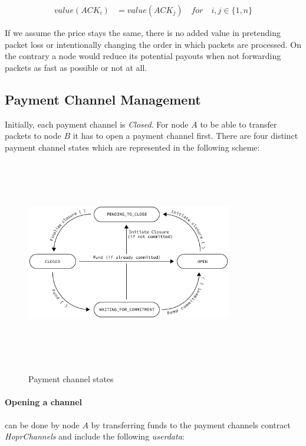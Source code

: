 \begin{align}
value ( ACK_i )  &  =value ( ACK_j ) \quad for \quad i,j\in \{1,n\}
\end{align}

If we assume the price stays the same, there is no added value in pretending
packet loss or intentionally changing the order in which packets are processed.
On the contrary a node would reduce its potential payouts when not forwarding
packets as fast as possible or not at all.

\subsection{Payment Channel Management}
\label{sec:paymentchannelmanagement}

Initially, each payment channel is \textit{Closed}. For node $A$ to be able to
transfer packets to node $B$ it has to open a payment channel first. There are
four distinct payment channel states which are represented in the following
scheme:

\begin{figure}[H]
    \centering
    \includegraphics[width=9cm,height=9cm,keepaspectratio]{../yellowpaper/images/statesTransition.png}
    \label{fig:payment channel states}
    \caption{Payment channel states}
\end{figure}

\paragraph{Opening a channel} can be done by node $A$ by transferring funds to
the payment channels contract \textit{HoprChannels} and include the following
\textit{userdata}:

